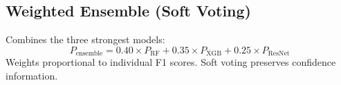 \documentclass[12pt,a4paper]{report}
\begin{document}
\begin{normalsize}
\section{Weighted Ensemble (Soft Voting)}
{\setlength{\baselineskip}{0.95\baselineskip}
Combines the three strongest models:
\begin{equation}
    P_{\text{ensemble}} = 0.40 \times P_{\text{RF}} + 0.35 \times P_{\text{XGB}} + 0.25 \times P_{\text{ResNet}}
\end{equation}
Weights proportional to individual F1 scores. Soft voting preserves confidence information.
\par}

\end{normalsize}

\newpage
\end{document}
